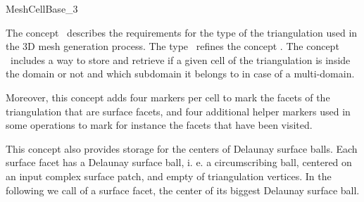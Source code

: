 \ccRefPageBegin


\begin{ccRefConcept}{MeshCellBase_3}


\ccDefinition
  
The concept \ccRefName\ describes the  requirements 
for the  type  of the triangulation
used in the 3D mesh generation process. The type \ccRefName\
refines the concept .
The concept  \ccRefName\ 
includes a way to store and retrieve 
if a given cell of the triangulation
is inside the domain or not 
and which subdomain it belongs to
in case of a multi-domain.

Moreover, this concept adds four markers per cell to mark the facets
of the triangulation that are surface facets,
and four additional helper markers
used in some operations to mark for instance
the facets that have been visited.

This concept also provides storage for  the centers of  Delaunay surface
balls.
Each surface facet has a  Delaunay surface ball, i. e. 
a circumscribing ball, centered 
on an input complex  surface patch,  
 and empty of triangulation vertices. 
In the following we call 
of a surface facet, the center of its biggest Delaunay surface ball.

\ccRefines
{} \\

\ccTypes




\end{ccRefConcept}
